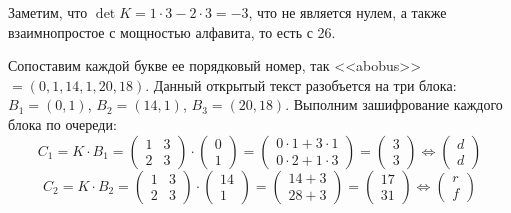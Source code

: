 \documentclass[a4paper]{article}
\begin{document}
  Заметим, что $\det{K} = 1\cdot 3 - 2\cdot 3 = -3$, что не является нулем, а также взаимнопростое
  с мощностью алфавита, то есть с 26.

  Сопоставим каждой букве ее порядковый номер, так <<abobus>> $ = (0, 1, 14, 1, 20, 18)$.
  Данный открытый текст разобъется на три блока: $B_1 = (0, 1)$, $B_2 = (14, 1)$, $B_3 = (20, 18)$.
  Выполним зашифрование каждого блока по очереди:
  \begin{equation} C_1 = K\cdot B_1 =
    \begin{pmatrix}
        1 & 3 \\ 2 & 3
    \end{pmatrix} \cdot \begin{pmatrix}
        0 \\ 1
    \end{pmatrix} = \begin{pmatrix}
        0\cdot 1 + 3\cdot 1 \\ 0 \cdot 2 + 1 \cdot 3
    \end{pmatrix} = \begin{pmatrix}
        3 \\ 3
    \end{pmatrix} \Leftrightarrow \begin{pmatrix}
        d \\ d
    \end{pmatrix}
  \end{equation}
  \begin{equation}
    C_2 = K\cdot B_2 = 
    \begin{pmatrix}
        1 & 3 \\ 2 & 3
    \end{pmatrix} \cdot \begin{pmatrix}
        14 \\ 1
    \end{pmatrix} = \begin{pmatrix}
        14 + 3 \\ 28 + 3
    \end{pmatrix} = \begin{pmatrix}
        17 \\ 31
    \end{pmatrix} \Leftrightarrow \begin{pmatrix}
        r \\ f
    \end{pmatrix}
  \end{equation}
\end{document}
